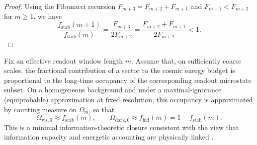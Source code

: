 \begin{proof}
Using the Fibonacci recursion $F_{m+3}=F_{m+2}+F_{m+1}$ and $F_{m+1}<F_{m+2}$ for $m\ge 1$, we have
\[
\frac{f_{\mathrm{stab}}(m+1)}{f_{\mathrm{stab}}(m)}
=\frac{F_{m+3}}{2F_{m+2}}
=\frac{F_{m+2}+F_{m+1}}{2F_{m+2}}
<1.
\]
\end{proof}
\begin{assumption}
\label{ass:occupancy_energy}
Fix an effective readout window length $m$.
Assume that, on sufficiently coarse scales, the fractional contribution of a sector to the cosmic energy budget is proportional to the long-time occupancy of the corresponding readout microstate subset.
On a homogeneous background and under a maximal-ignorance (equiprobable) approximation at fixed resolution, this occupancy is approximated by counting measure on $\Omega_m$, so that
\[
\Omega_{\mathrm{vis},0}\approx f_{\mathrm{stab}}(m),
\qquad
\Omega_{\mathrm{dark},0}\approx f_{\mathrm{hid}}(m)=1-f_{\mathrm{stab}}(m).
\]
This is a minimal information-theoretic closure consistent with the view that information capacity and energetic accounting are physically linked \cite{Bekenstein1973,Jacobson1995,Landauer1961}.
\end{assumption}

